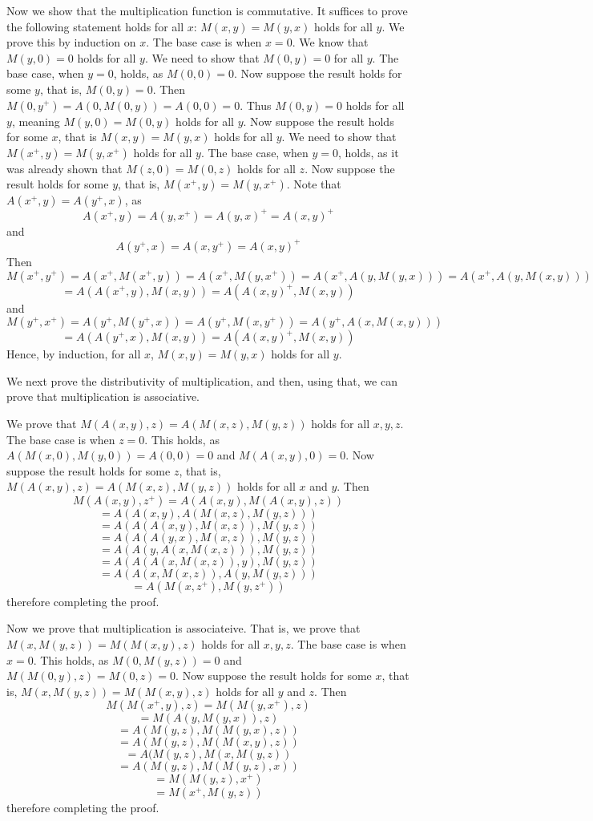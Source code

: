 \documentclass{article}
\theoremstyle{definition}
\begin{document}
Now we show that the multiplication function is commutative. It suffices to prove the following statement holds for all $x$: $M(x,y)=M(y,x)$ holds for all $y$. We prove this by induction 
on $x$. The base case is when $x=0$. We know that $M(y,0)=0$ holds for all $y$. We need to show that $M(0,y)=0$ for all $y$. The base case, when $y=0$, holds, as $M(0,0)=0$. Now suppose the result 
holds for some $y$, that is, $M(0,y)=0$. Then $M(0,y^+)=A(0,M(0,y))=A(0,0)=0$. Thus $M(0,y)=0$ holds for all $y$, meaning $M(y,0)=M(0,y)$ holds for all $y$. Now suppose the result holds for some 
$x$, that is $M(x,y)=M(y,x)$ holds for all $y$. We need to show that $M(x^+,y)=M(y,x^+)$ holds for all $y$. The base case, when $y=0$, holds, as it was already shown that 
$M(z,0)=M(0,z)$ holds for all $z$. Now suppose the result holds for some $y$, that is, $M(x^+,y)=M(y,x^+)$. Note that $A(x^+,y)=A(y^+,x)$, as
\[ A(x^+,y)=A(y,x^+)=A(y,x)^+=A(x,y)^+ \] and
\[ A(y^+,x)=A(x,y^+)=A(x,y)^+ \]
Then
\[ M(x^+,y^+)=A(x^+,M(x^+,y))=A(x^+,M(y,x^+))=A(x^+,A(y,M(y,x)))=A(x^+,A(y,M(x,y))) \]
\[ =A(A(x^+,y),M(x,y))=A(A(x,y)^+,M(x,y)) \]
and
\[ M(y^+,x^+)=A(y^+,M(y^+,x))=A(y^+,M(x,y^+))=A(y^+,A(x,M(x,y))) \]
\[ =A(A(y^+,x),M(x,y))=A(A(x,y)^+,M(x,y)) \]
Hence, by induction, for all $x$, $M(x,y)=M(y,x)$ holds for all $y$.

We next prove the distributivity of multiplication, and then, using that, we can prove that multiplication is associative.

We prove that $M(A(x,y),z)=A(M(x,z),M(y,z))$ holds for all $x,y,z$. The base case is when $z=0$. This holds, as
$A(M(x,0),M(y,0))=A(0,0)=0$ and $M(A(x,y),0)=0$. Now suppose the result holds for some $z$, that is, 
$M(A(x,y),z)=A(M(x,z),M(y,z))$ holds for all $x$ and $y$. Then
\[ M(A(x,y),z^+)=A(A(x,y),M(A(x,y),z)) \]
\[ =A(A(x,y),A(M(x,z),M(y,z))) \]
\[ =A(A(A(x,y),M(x,z)),M(y,z)) \]
\[ =A(A(A(y,x),M(x,z)),M(y,z)) \]
\[ =A(A(y,A(x,M(x,z))),M(y,z)) \]
\[ =A(A(A(x,M(x,z)),y),M(y,z)) \]
\[ =A(A(x,M(x,z)),A(y,M(y,z))) \]
\[ =A(M(x,z^+),M(y,z^+)) \]
therefore completing the proof.


Now we prove that multiplication is associateive. That is, we prove that $M(x,M(y,z))=M(M(x,y),z)$ holds for all $x,y,z$. The base case is when $x=0$. 
This holds, as $M(0,M(y,z))=0$ and $M(M(0,y),z)=M(0,z)=0$. Now suppose the result holds for some $x$, that is, 
$M(x,M(y,z))=M(M(x,y),z)$ holds for all $y$ and $z$. Then
\[ M(M(x^+,y),z)=M(M(y,x^+),z) \]
\[ =M(A(y,M(y,x)),z) \]
\[ =A(M(y,z),M(M(y,x),z)) \]
\[ =A(M(y,z),M(M(x,y),z)) \]
\[ =A(M(y,z),M(x,M(y,z)) \]
\[ =A(M(y,z),M(M(y,z),x)) \]
\[ =M(M(y,z),x^+) \]
\[ =M(x^+,M(y,z)) \]
therefore completing the proof.
\end{document}
